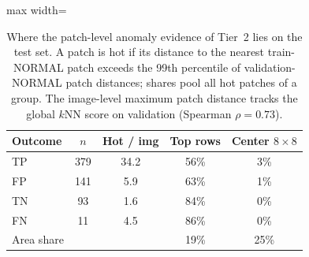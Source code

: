 \begin{table}[t]
\centering
\footnotesize
\setlength{\tabcolsep}{3.5pt}
\begin{adjustbox}{max width=\columnwidth}
\begin{tabular}{lcccc}
\toprule
Outcome & $n$ & Hot / img & Top rows & Center $8{\times}8$ \\
\midrule
TP & 379 & 34.2 & 56\% & 3\% \\
FP & 141 & 5.9 & 63\% & 1\% \\
TN & 93 & 1.6 & 84\% & 0\% \\
FN & 11 & 4.5 & 86\% & 0\% \\
\midrule
Area share & & & 19\% & 25\% \\
\bottomrule
\end{tabular}
\end{adjustbox}
\caption{Where the patch-level anomaly evidence of Tier~2 lies on the test set. A patch is hot if its distance to the nearest train-NORMAL patch exceeds the 99th percentile of validation-NORMAL patch distances; shares pool all hot patches of a group. The image-level maximum patch distance tracks the global $k$NN score on validation (Spearman $\rho=0.73$).}
\label{tab:heat}
\end{table}
